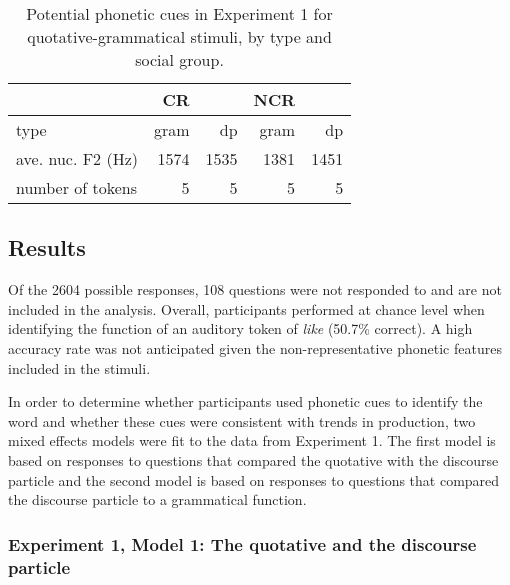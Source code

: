 \begin{table}[ht]
\begin{center}
\begin{tabular}{lrrrr}
  \hline
  
   
  	 						&	CR 		&			& NCR &  \\
  	 	  \hline
type						& gram & dp 	&  gram  & dp   \\
ave. nuc. F2 (Hz)        &  1574 &	1535  &   1381  &	1451 \\
number of tokens	& 5  & 5  & 5  & 5  \\

   \hline
   
\end{tabular}
\caption{Potential phonetic cues in Ex\-peri\-ment 1 for quota\-tive-gram\-mati\-cal stimuli, by type and social group.}\label{tab:cues1gd}
\end{center}
\end{table}	




\subsection{Results}
Of the 2604 possible responses, 108 questions were not responded to and are not included in the analysis.  Overall, participants performed at chance level when identifying the function of an auditory token of \textit{like} (50.7\% correct).  A high accuracy rate was not anticipated given the non-representative phonetic features included in the stimuli.

In order to determine whether participants used phonetic cues to identify the word and whether these cues were consistent with trends in production, two mixed effects models were fit to the data from Experiment 1. The first model is based on responses to questions that compared the quotative with the discourse particle and the second model is based on responses to questions that compared the discourse particle to a grammatical function.


\subsubsection{Experiment 1, Model 1: The quotative and the discourse particle}

